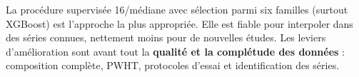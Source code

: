 \begin{aretenir}
La procédure supervisée 16/médiane avec sélection parmi six familles (surtout
XGBoost) est l'approche la plus appropriée. Elle est fiable pour interpoler dans des séries
connues, nettement moins pour de nouvelles études. Les leviers d'amélioration
sont avant tout la \textbf{qualité et la complétude des données} : composition
complète, PWHT, protocoles d'essai et identification des séries.
\end{aretenir}
